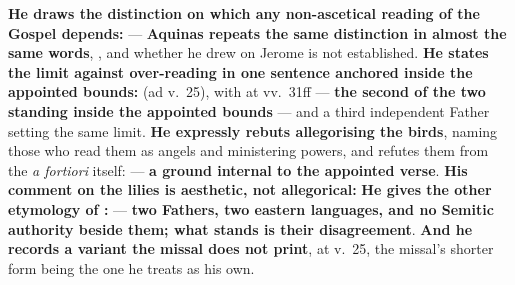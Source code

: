 \begin{witnessnote}
\textbf{He draws the distinction on which any non-ascetical reading of the
Gospel depends:}  --- \textbf{Aquinas
repeats the same distinction in almost the same words}, , and whether he drew on Jerome is not
established. \textbf{He states the limit against over-reading in one sentence
anchored inside the appointed bounds:}  (ad v.~25), with  at vv.~31ff --- \textbf{the
second of the two standing inside the appointed bounds} --- and a third
independent Father setting the same limit. \textbf{He expressly rebuts
allegorising the birds}, naming those who read them as angels and ministering
powers, and refutes them from the \emph{a fortiori} itself:  --- \textbf{a ground internal
to the appointed verse}.
\textbf{His comment on the lilies is aesthetic, not allegorical:}
 \textbf{He gives the other etymology of :}
 --- \textbf{two Fathers,
two eastern languages, and no Semitic authority beside them; what stands is
their disagreement}. \textbf{And he records a variant the missal does not
print},  at
v.~25, the missal's shorter form being the one he treats as his own.
\end{witnessnote}

